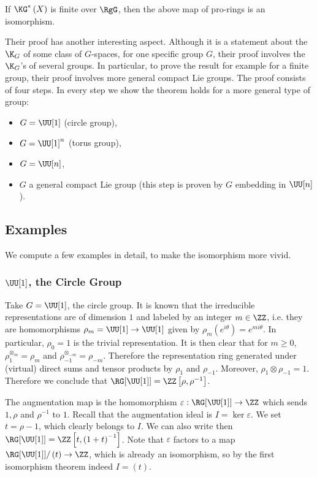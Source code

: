 \begin{theorem}[{\cite{AS}}]
	If $\KG^*\left(X\right)$ is finite over $\RgG$, then the above map of pro-rings is an isomorphism.
\end{theorem}

Their proof has another interesting aspect.
Although it is a statement about the $\K_G$ of some class of $G$-spaces, for one specific group $G$, their proof involves the $\K_G$'s of several groups.
In particular, to prove the result for example for a finite group, their proof involves more general compact Lie groups.
The proof consists of four steps.
In every step we show the theorem holds for a more general type of group:
\begin{itemize}
	\item $G = \UU[1]$ (circle group),
	\item $G = \UU[1]^n$ (torus group),
	\item $G = \UU[n]$,
	\item $G$ a general compact Lie group (this step is proven by $G$ embedding in $\UU[n]$).
\end{itemize}



\subsection{Examples}

We compute a few examples in detail, to make the isomorphism more vivid.

\subsubsection{\texorpdfstring{$\UU[1]$}{U(1)}, the Circle Group}

Take $G = \UU[1]$, the circle group.
It is known that the irreducible representations are of dimension $1$ and labeled by an integer $m \in \ZZ$, i.e. they are homomorphisms $\rho_m = \UU[1] \to \UU[1]$ given by $\rho_m\left(e^{i \theta}\right) = e^{m i \theta}$.
In particular, $\rho_0 = 1$ is the trivial representation.
It is then clear that for $m \geq 0$, $\rho_1^{\otimes_m} = \rho_m$ and $\rho_{-1}^{\otimes_{-m}} = \rho_{-m}$.
Therefore the representation ring generated under (virtual) direct sums and tensor products by $\rho_1$ and $\rho_{-1}$.
Moreover, $\rho_1 \otimes \rho_{-1} = 1$.
Therefore we conclude that $\RG[\UU[1]] = \ZZ\left[\rho, \rho^{-1}\right]$.

The augmentation map is the homomorphism $\varepsilon: \RG[\UU[1]] \to \ZZ$ which sends $1,\rho$ and $\rho^{-1}$ to $1$.
Recall that the augmentation ideal is $I = \ker \varepsilon$.
We set $t = \rho-1$, which clearly belongs to $I$.
We can also write then $\RG[\UU[1]] = \ZZ\left[t, \left(1+t\right)^{-1}\right]$.
Note that $\varepsilon$ factors to a map $\RG[\UU[1]]/\left(t\right) \to \ZZ$, which is already an isomorphism, so by the first isomorphism theorem indeed $I = \left(t\right)$.

